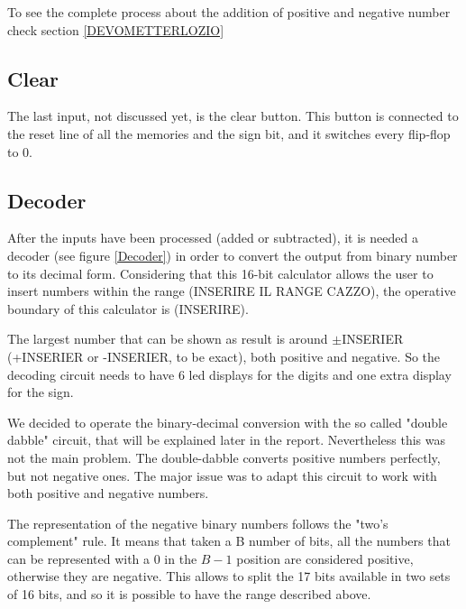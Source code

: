 \documentclass{article}
\begin{document}
\vspace{3mm}

To see the complete process about the addition of positive and negative number check section \ref{DEVOMETTERLOZIO}

\subsection{Clear}

The last input, not discussed yet, is the clear button. This button is connected to the reset line of all the memories and the sign bit, and it switches every flip-flop to 0. 

\clearpage
\subsection{Decoder}

After the inputs have been processed (added or subtracted), it is needed a decoder (see figure \ref{Decoder}) in order to convert the output from binary number to its decimal form. Considering that this 16-bit calculator allows the user to insert numbers within the range (INSERIRE IL RANGE CAZZO), the operative boundary of this calculator is (INSERIRE).

\vspace{3mm}

The largest number that can be shown as result is around $\pm$INSERIER (+INSERIER or -INSERIER, to be exact), both positive and negative. So the decoding circuit needs to have 6 led displays for the digits and one extra display for the sign.

\vspace{3mm}

We decided to operate the binary-decimal conversion with the so called "double dabble" circuit, that will be explained later in the report. Nevertheless this was not the main problem. The double-dabble converts positive numbers perfectly, but not negative ones. The major issue was to adapt this circuit to work with both positive and negative numbers. 

The representation of the negative binary numbers follows the "two's complement" rule. It means that taken a B number of bits, all the numbers that can be represented with a 0 in the $B-1$ position are considered positive, otherwise they are negative. This allows to split the 17 bits available in two sets of 16 bits, and so it is possible to have the range described above.
\end{document}
